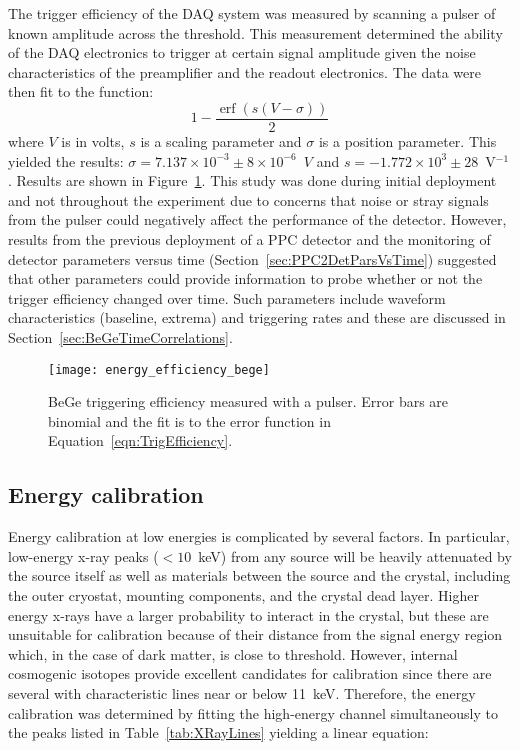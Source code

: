 The trigger efficiency of the DAQ system was measured by scanning a pulser of known amplitude across the threshold.  %
This measurement determined the ability of the DAQ electronics to trigger at certain signal amplitude given the noise characteristics of the preamplifier and the readout electronics.  The data were then fit to the function:
			\begin{equation}
				1 - \frac{\operatorname{erf} \left(s(V-\sigma)\right)}{2}
				\label{eqn:TrigEfficiency}
			\end{equation}
where $V$ is in volts, $s$ is a scaling parameter and $\sigma$ is a position parameter.  This yielded the results: $\sigma = 7.137\times10^{-3}\pm8\times10^{-6}$~$V$ and $s = -1.772\times10^{3}\pm28$~V$^{-1}$.  Results are shown in Figure~\ref{fig:BeGeTriggeringEfficiency}.  This study was done during initial deployment and not throughout the experiment due to concerns that noise or stray signals from the pulser could negatively affect the performance of the detector.  However, results from the previous deployment of a PPC detector and the monitoring of detector parameters versus time (Section~\ref{sec:PPC2DetParsVsTime}) suggested that other parameters could provide information to probe whether or not the trigger efficiency changed over time.  Such parameters include waveform characteristics (baseline, extrema) and triggering rates and these are discussed in Section~\ref{sec:BeGeTimeCorrelations}.

			\begin{figure}
				\centering
				\texttt{[image: energy\_efficiency\_bege]}
				\caption[BeGe triggering efficiency measured with a pulser]
				{BeGe triggering efficiency measured with a pulser.  Error bars are binomial and the fit is to the error function in
				Equation~\ref{eqn:TrigEfficiency}.}
				\label{fig:BeGeTriggeringEfficiency}
			\end{figure}

		\subsection{Energy calibration}

Energy calibration at low energies is complicated by several factors.  In particular, low-energy x-ray peaks ($<10$~keV) from any source will be heavily attenuated by the source itself as well as materials between the source and the crystal, including the outer cryostat, mounting components, and the crystal dead layer.  Higher energy x-rays have a larger probability to interact in the crystal, but these are unsuitable for calibration because of their distance from the signal energy region which, in the case of dark matter, is close to threshold.  However, internal cosmogenic isotopes provide excellent candidates for calibration since there are several with characteristic lines near or below 11~keV.  Therefore, the energy calibration was determined by fitting the high-energy channel simultaneously to the peaks listed in Table~\ref{tab:XRayLines} yielding a linear equation:

